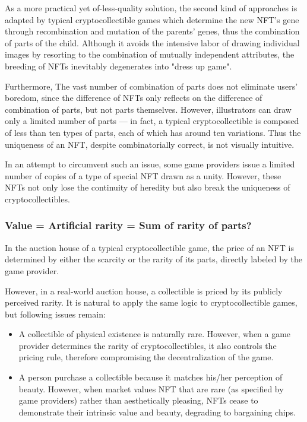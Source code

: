 \documentclass[a4paper]{article}
\begin{document}
As a more practical yet of-less-quality solution, the second kind of approaches is adapted by typical cryptocollectible games\cite{cryptokitties,etherwaifu,cryptofighters} which determine the new NFT's gene through recombination and mutation of the parents' genes, thus the combination of parts of the child. Although it avoids the intensive labor of drawing individual images by resorting to the combination of mutually independent attributes, the breeding of NFTs inevitably degenerates into "dress up game".

Furthermore, The vast number of combination of parts does not eliminate users' boredom, since the difference of NFTs only reflects on the difference of combination of parts, but not parts themselves. However, illustrators can draw only a limited number of parts --- in fact, a typical cryptocollectible is composed of less than ten types of parts, each of which has around ten variations. Thus the uniqueness of an NFT, despite combinatorially correct, is not visually intuitive.

In an attempt to circumvent such an issue, some game providers issue a limited number of copies of a type of special NFT drawn as a unity. However, these NFTs not only lose the continuity of heredity but also break the uniqueness of cryptocollectibles.

\subsubsection{Value = Artificial rarity = Sum of rarity of parts?}

In the auction house of a typical cryptocollectible game, the price of an NFT is determined by either the scarcity or the rarity of its parts, directly labeled by the game provider.

However, in a real-world auction house, a collectible is priced by its publicly perceived rarity. It is natural to apply the same logic to cryptocollectible games, but following issues remain:

\begin{itemize}
\item A collectible of physical existence is naturally rare. However, when a game provider determines the rarity of cryptocollectibles, it also controls the pricing rule, therefore compromising the decentralization of the game.
\item A person purchase a collectible because it matches his/her perception of beauty. However, when market values NFT that are rare (as specified by game providers) rather than aesthetically pleasing, NFTs cease to demonstrate their intrinsic value and beauty, degrading to bargaining chips. 
\end{itemize}
\end{document}
